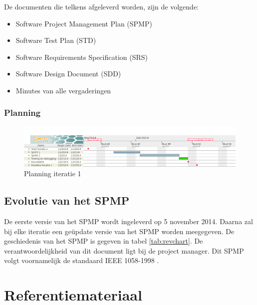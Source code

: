 De documenten die telkens afgeleverd worden, zijn de volgende:

\begin{itemize}
\item Software Project Management Plan (SPMP)
\item Software Test Plan (STD)
\item Software Requirements Specification (SRS)
\item Software Design Document (SDD)
\item Minutes van alle vergaderingen
\end{itemize}

\newpage  
\subsubsection{Planning}
\begin{figure}[h]
\centering
\includegraphics[width=1.2\linewidth]{./document.png}
\caption{Planning iteratie 1}
\label{fig:planning}
\end{figure}

  

\subsection{Evolutie van het SPMP}
De eerste versie van het SPMP wordt ingeleverd op 5 november 2014. Daarna zal bij elke iteratie een geüpdate versie van het SPMP worden meegegeven. De geschiedenis van het SPMP is gegeven in tabel \ref{tab:revchart}. De verantwoordelijkheid van dit document ligt bij de project manager. Dit SPMP volgt voornamelijk de standaard IEEE 1058-1998 \cite{ieeestd}.

\section{Referentiemateriaal}

